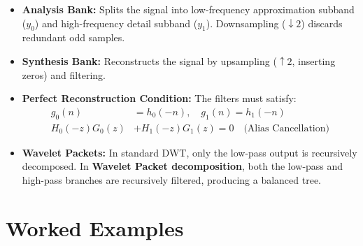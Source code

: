 \documentclass[12pt,a4paper]{article}
\begin{document}
\begin{itemize}[leftmargin=*, itemsep=3.5pt]
  \item \textbf{Analysis Bank:} Splits the signal into low-frequency approximation subband ($y_0$) and high-frequency detail subband ($y_1$). Downsampling ($\downarrow 2$) discards redundant odd samples.
  \item \textbf{Synthesis Bank:} Reconstructs the signal by upsampling ($\uparrow 2$, inserting zeros) and filtering.
  \item \textbf{Perfect Reconstruction Condition:} The filters must satisfy:
    \begin{align}
      g_0(n) &= h_0(-n), \quad g_1(n) = h_1(-n) \\
      H_0(-z)G_0(z) &+ H_1(-z)G_1(z) = 0 \quad \text{(Alias Cancellation)}
    \end{align}
  \item \textbf{Wavelet Packets:} In standard DWT, only the low-pass output is recursively decomposed. In \textbf{Wavelet Packet decomposition}, both the low-pass and high-pass branches are recursively filtered, producing a balanced tree.
\end{itemize}

\section{Worked Examples}
\end{document}
